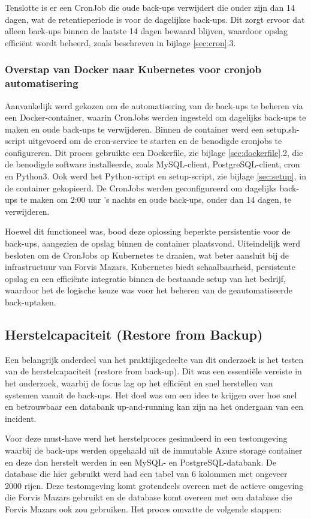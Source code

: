 Tenslotte is er een CronJob die oude back-ups verwijdert die ouder zijn dan 14 dagen, wat de retentieperiode is voor de dagelijkse back-ups. Dit zorgt ervoor dat alleen back-ups binnen de laatste 14 dagen bewaard blijven, waardoor opslag efficiënt wordt beheerd, zoals beschreven in bijlage \ref{sec:cron}.3.

\subsubsection{Overstap van Docker naar Kubernetes voor cronjob automatisering}
Aanvankelijk werd gekozen om de automatisering van de back-ups te beheren via een Docker-container, waarin CronJobs werden ingesteld om dagelijks back-ups te maken en oude back-ups te verwijderen. Binnen de container werd een setup.sh-script uitgevoerd om de cron-service te starten en de benodigde cronjobs te configureren. Dit proces gebruikte een Dockerfile, zie bijlage \ref{sec:dockerfile}.2, die de benodigde software installeerde, zoals MySQL-client, PostgreSQL-client, cron en Python3. Ook werd het Python-script en setup-script, zie bijlage \ref{sec:setup}, in de container gekopieerd. De CronJobs werden geconfigureerd om dagelijks back-ups te maken om 2:00 uur 's nachts en oude back-ups, ouder dan 14 dagen, te verwijderen.

Hoewel dit functioneel was, bood deze oplossing beperkte persistentie voor de back-ups, aangezien de opslag binnen de container plaatsvond. Uiteindelijk werd besloten om de CronJobs op Kubernetes te draaien, wat beter aansluit bij de infrastructuur van Forvis Mazars. Kubernetes biedt schaalbaarheid, persistente opslag en een efficiënte integratie binnen de bestaande setup van het bedrijf, waardoor het de logische keuze was voor het beheren van de geautomatiseerde back-uptaken.

\subsection{Herstelcapaciteit (Restore from Backup)}
Een belangrijk onderdeel van het praktijkgedeelte van dit onderzoek is het testen van de herstelcapaciteit (restore from back-up). Dit was een essentiële vereiste in het onderzoek, waarbij de focus lag op het efficiënt en snel herstellen van systemen vanuit de back-ups. Het doel was om een idee te krijgen over hoe snel en betrouwbaar een databank up-and-running kan zijn na het ondergaan van een incident.

Voor deze must-have werd het herstelproces gesimuleerd in een testomgeving waarbij de back-ups werden opgehaald uit de immutable Azure storage container en deze dan herstelt werden in een MySQL- en PostgreSQL-databank. De database die hier gebruikt werd had een tabel van 6 kolommen met ongeveer 2000 rijen. Deze testomgeving komt grotendeels overeen met de actieve omgeving die Forvis Mazars gebruikt en de database komt overeen met een database die Forvis Mazars ook zou gebruiken. Het proces omvatte de volgende stappen:

